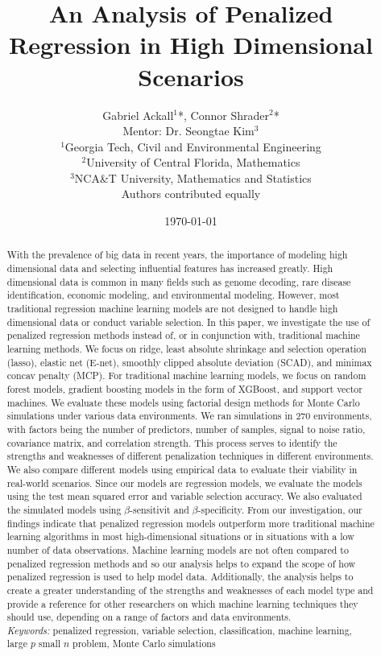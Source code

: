 \documentclass{article}
\title{An Analysis of Penalized Regression in High Dimensional Scenarios} %
\author{Gabriel Ackall$^1$*, Connor Shrader$^2$* \\
		Mentor: Dr. Seongtae Kim$^3$ \\	
		{\footnotesize $^1$Georgia Tech, Civil and Environmental Engineering} \\
		{\footnotesize $^2$University of Central  Florida, Mathematics} \\
		{\footnotesize $^3$NCA\&T University, Mathematics and Statistics} \\
		{\footnotesize *Authors contributed equally}}
\date{\today}
\begin{document}
\maketitle
\begin{abstract}
	With the prevalence of big data in recent years, the importance of modeling high dimensional data and selecting influential features has increased greatly. High dimensional data is common in many fields such as genome decoding, rare disease identification, economic modeling, and environmental modeling. However, most traditional regression machine learning models are not designed to handle high dimensional data or conduct variable selection. In this paper, we investigate the use of penalized regression methods instead of, or in conjunction with, traditional machine learning methods. We focus on ridge, least absolute shrinkage and selection operation (lasso), elastic net (E-net), smoothly clipped absolute deviation (SCAD), and minimax concav penalty (MCP). For traditional machine learning models, we focus on random forest models, gradient boosting models in the form of XGBoost, and support vector machines. We evaluate these models using factorial design methods for Monte Carlo simulations under various data environments. We ran simulations in 270 environments, with factors being the number of predictors, number of samples, signal to noise ratio, covariance matrix, and correlation strength. This process serves to identify the strengths and weaknesses of different penalization techniques in different environments. We also compare different models using empirical data to evaluate their viability in real-world scenarios. Since our models are regression models, we evaluate the models using the test mean squared error and variable selection accuracy. We also evaluated the simulated models using $\beta$-sensitivit and $\beta$-specificity. From our investigation, our findings indicate that penalized regression models outperform more traditional machine learning algorithms in most high-dimensional situations or in situations with a low number of data observations. Machine learning models are not often compared to penalized regression methods and so our analysis helps to expand the scope of how penalized regression is used to help model data. Additionally, the analysis helps to create a greater understanding of the strengths and weaknesses of each model type and provide a reference for other researchers on which machine learning techniques they should use, depending on a range of factors and data environments. \\
	
	\textit{Keywords:} penalized regression, variable selection, classification, machine learning, large $p$ small $n$ problem, Monte Carlo simulations
\end{abstract}
\end{document}
